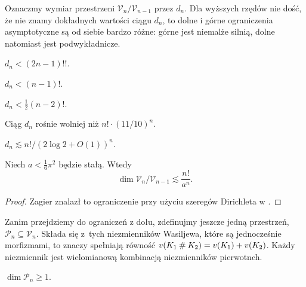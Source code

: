 Oznaczmy wymiar przestrzeni $\mathcal V_n / \mathcal V_{n-1}$ przez $d_n$.
Dla wyższych rzędów nie dość, że nie znamy dokładnych wartości ciągu $d_n$, to dolne i górne ograniczenia asymptotyczne są od siebie bardzo różne: górne jest niemalże silnią, dolne natomiast jest podwykładnicze.

\begin{proposition}
    $d_n < (2n-1)!!$.
\end{proposition}

\begin{proposition}
    $d_n < (n-1)!$.
\end{proposition}

\begin{proposition}[Ng, 1995]
    $d_n < \frac 12 (n-2)!$.
\end{proposition}

\begin{proposition}[Stojmenow, 1996]
    Ciąg $d_n$ rośnie wolniej niż $n! \cdot (11/10)^n$.
\end{proposition}

\begin{proposition}
    $d_n \lesssim n! / (2 \log 2 + O(1))^n$.
\end{proposition}

\begin{proposition}[Zagier, 2001]
    Niech $a < \frac 1 6 \pi^2$ będzie stałą.
    Wtedy
    \begin{equation}
        \dim \mathcal V_n / \mathcal V_{n-1} \lesssim \frac{n!}{a^n}.
    \end{equation}
\end{proposition}

\begin{proof}
    Zagier znalazł to ograniczenie przy użyciu szeregów Dirichleta w \cite{zagier01}.
\end{proof}

Zanim przejdziemy do ograniczeń z dołu, zdefinujmy jeszcze jedną przestrzeń, $\mathcal P_n \subseteq \mathcal V_n$.
Składa się z~tych niezmienników Wasiljewa, które są jednocześnie morfizmami, to znaczy spełniają równość $v(K_1 \mathbin{\#} K_2) = v(K_1) + v(K_2)$.
Każdy niezmiennik jest wielomianową kombinacją niezmienników pierwotnch.

\begin{proposition}
    $\dim \mathcal P_n \ge 1$.
\end{proposition}

